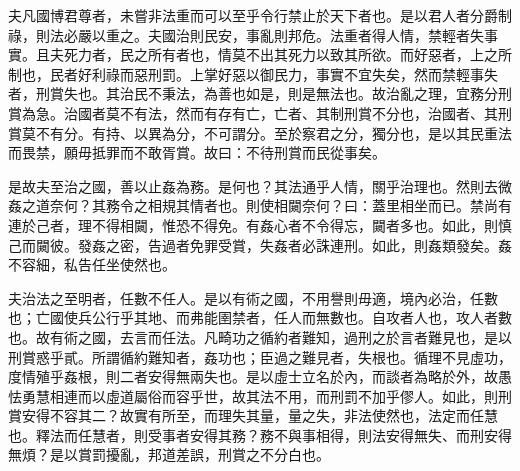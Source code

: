 
\begin{pinyinscope}
夫凡國博君尊者，未嘗非法重而可以至乎令行禁止於天下者也。是以君人者分爵制祿，則法必嚴以重之。夫國治則民安，事亂則邦危。法重者得人情，禁輕者失事實。且夫死力者，民之所有者也，情莫不出其死力以致其所欲。而好惡者，上之所制也，民者好利祿而惡刑罰。上掌好惡以御民力，事實不宜失矣，然而禁輕事失者，刑賞失也。其治民不秉法，為善也如是，則是無法也。故治亂之理，宜務分刑賞為急。治國者莫不有法，然而有存有亡，亡者、其制刑賞不分也，治國者、其刑賞莫不有分。有持、以異為分，不可謂分。至於察君之分，獨分也，是以其民重法而畏禁，願毋抵罪而不敢胥賞。故曰：不待刑賞而民從事矣。

是故夫至治之國，善以止姦為務。是何也？其法通乎人情，關乎治理也。然則去微姦之道奈何？其務令之相規其情者也。則使相闚奈何？曰：蓋里相坐而已。禁尚有連於己者，理不得相闚，惟恐不得免。有姦心者不令得忘，闚者多也。如此，則慎己而闚彼。發姦之密，告過者免罪受賞，失姦者必誅連刑。如此，則姦類發矣。姦不容細，私告任坐使然也。

夫治法之至明者，任數不任人。是以有術之國，不用譽則毋適，境內必治，任數也；亡國使兵公行乎其地、而弗能圉禁者，任人而無數也。自攻者人也，攻人者數也。故有術之國，去言而任法。凡畸功之循約者難知，過刑之於言者難見也，是以刑賞惑乎貳。所謂循約難知者，姦功也；臣過之難見者，失根也。循理不見虛功，度情殖乎姦根，則二者安得無兩失也。是以虛士立名於內，而談者為略於外，故愚怯勇慧相連而以虛道屬俗而容乎世，故其法不用，而刑罰不加乎僇人。如此，則刑賞安得不容其二？故實有所至，而理失其量，量之失，非法使然也，法定而任慧也。釋法而任慧者，則受事者安得其務？務不與事相得，則法安得無失、而刑安得無煩？是以賞罰擾亂，邦道差誤，刑賞之不分白也。


\end{pinyinscope}